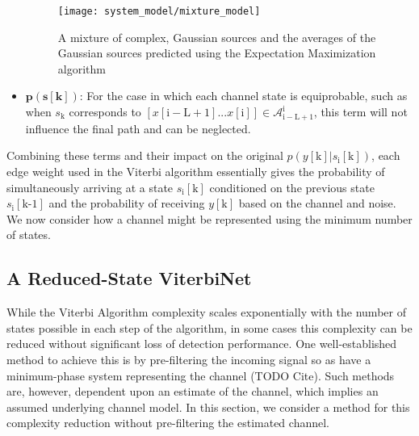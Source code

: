 \begin{itemize}

\begin{figure}[H]
\centering
	\texttt{[image: system\_model/mixture\_model]}
	  	  \caption{A mixture of complex, Gaussian sources and the averages of the Gaussian sources predicted using the Expectation Maximization algorithm}
	  \label{fig:mm}
\end{figure}

\item $\mathbf{p(s[\text{k}])}$: For the case in which each channel state is equiprobable, such as when $s_{\text{k}}$ corresponds to $\left[x[\mathrm{i-L+1}]...x[\mathrm{i}]\right] \in \mathcal{A}_{\mathrm{i-L+1}}^{\mathrm{i}}$, this term will not influence the final path and can be neglected.

\end{itemize}

Combining these terms and their impact on the original $p(y[\mathrm{k}]|s_{\text{i}}[\text{k}])$, each edge weight used in the Viterbi algorithm essentially gives the probability of simultaneously arriving at a state $s_{\text{i}}[\text{k}]$ conditioned on the previous state $s_{\text{i}}[\text{k-1}]$ and the probability of receiving $y[\mathrm{k}]$ based on the channel and noise. 
We now consider how a channel might be represented using the minimum number of states.

\subsection{A Reduced-State ViterbiNet}
While the Viterbi Algorithm complexity scales exponentially with the number of states possible in each step of the algorithm, in some cases this complexity can be reduced without significant loss of detection performance. One well-established method to achieve this is by pre-filtering the incoming signal so as have a minimum-phase system representing the channel (TODO Cite). Such methods are, however, dependent upon an estimate of the channel, which  implies an assumed underlying channel model. In this section, we consider a method for this complexity reduction without pre-filtering the estimated channel.



